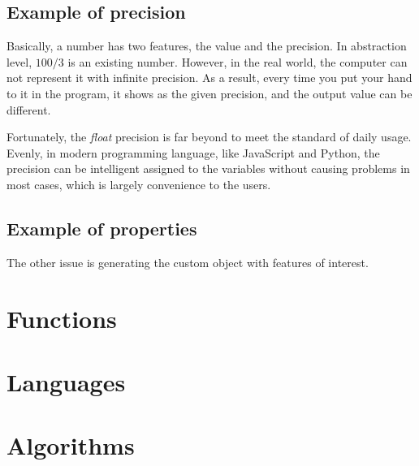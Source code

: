 \subsection{Example of precision}

Basically, a number has two features, the value and the precision.
In abstraction level, $100/3$ is an existing number.
However, in the real world, the computer can not represent it with infinite precision.
As a result, every time you put your hand to it in the program,
it shows as the given precision,
and the output value can be different.



Fortunately, the \emph{float} precision is far beyond to meet the standard of daily usage.
Evenly, in modern programming language, like JavaScript and Python,
the precision can be intelligent assigned to the variables without causing problems in most cases,
which is largely convenience to the users.

\subsection{Example of properties}

The other issue is generating the custom object with features of interest.



\section{Functions}

\section{Languages}

\section{Algorithms}

